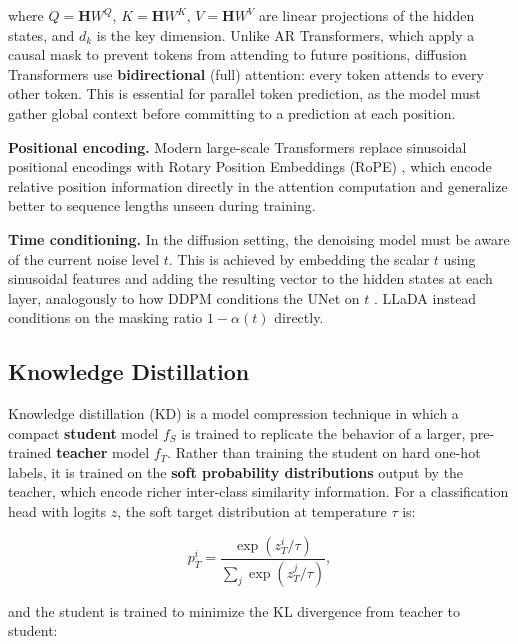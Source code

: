 \documentclass[11pt, a4paper]{article}
\begin{document}
\noindent where $Q = \mathbf{H}W^Q$, $K = \mathbf{H}W^K$, $V = \mathbf{H}W^V$ are
linear projections of the hidden states, and $d_k$ is the key dimension. Unlike AR
Transformers, which apply a causal mask to prevent tokens from attending to future
positions, diffusion Transformers use \textbf{bidirectional} (full) attention: every token
attends to every other token. This is essential for parallel token prediction, as the model
must gather global context before committing to a prediction at each position.

\textbf{Positional encoding.} Modern large-scale Transformers replace sinusoidal
positional encodings with Rotary Position Embeddings (RoPE) \cite{su2024rope}, which
encode relative position information directly in the attention computation and generalize
better to sequence lengths unseen during training.

\textbf{Time conditioning.} In the diffusion setting, the denoising model must be aware of
the current noise level $t$. This is achieved by embedding the scalar $t$ using sinusoidal
features and adding the resulting vector to the hidden states at each layer, analogously to
how DDPM conditions the UNet on $t$ \cite{ho2020ddpm}. LLaDA instead conditions on the
masking ratio $1 - \alpha(t)$ directly.

\subsection{Knowledge Distillation}
\label{subsec:knowledge_distillation}

Knowledge distillation (KD) \cite{hinton2015distilling} is a model compression technique in
which a compact \textbf{student} model $f_S$ is trained to replicate the behavior of a
larger, pre-trained \textbf{teacher} model $f_T$. Rather than training the student on
hard one-hot labels, it is trained on the \textbf{soft probability distributions} output by
the teacher, which encode richer inter-class similarity information. For a classification
head with logits $z$, the soft target distribution at temperature $\tau$ is:

\begin{equation}
    p_T^i = \frac{\exp(z_T^i / \tau)}{\sum_j \exp(z_T^j / \tau)},
    \label{eq:soft_targets}
\end{equation}

\noindent and the student is trained to minimize the KL divergence from teacher to student:
\end{document}
